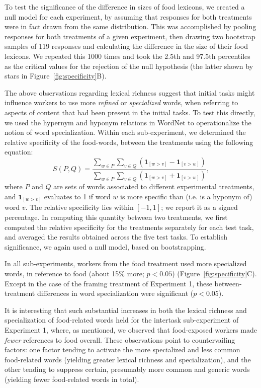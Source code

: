 \documentclass{sigchi}
\begin{document}
To test the significance of the difference in sizes of food
lexicons,
we created a null model for each experiment, by assuming that
responses for both treatments were in fact drawn from the same 
distribution.
This was accomplished by pooling responses for both treatments 
of a given experiment, then 
drawing two bootstrap samples of 119 responses and calculating
the difference in the size of their food lexicons.  
We repeated this 1000 times and took the 2.5th and 97.5th percentiles 
as the critical values for the rejection of the null hypothesis 
(the latter shown by stars in Figure~\ref{fig:specificity}B).

The above observations regarding lexical richness suggest that initial 
tasks might influence workers to use more \textit{refined} or 
\textit{specialized} words, when referring to aspects 
of content that had been present in the initial tasks.  
To test this directly, we used the hypernym and hyponym relations in 
WordNet to operationalize the notion of word specialization.  
Within each sub-experiment, we determined the relative specificity
of the food-words, between the treatments using the following equation:
\begin{equation}
	S(P,Q) = \frac{
		\sum_{w\in P}\sum_{v\in Q} \left(
			\mathbf{1}_{[w>v]} - \mathbf{1}_{[v>w]} \right)
	}{
		\sum_{w\in P}\sum_{v\in Q} \left(
			\mathbf{1}_{[w>v]} + \mathbf{1}_{[v>w]} \right)
	},
\end{equation}
where $P$ and $Q$ are sets of words associated to different experimental 
treatments, and $\mathbf{1}_{[w>v]}$ evaluates
to 1 if word $w$ is more specific than (i.e. is a hyponym of) word $v$.
The relative specificity lies within $[-1,1]$; 
we report it as a signed percentage.
In computing this quantity between two treatments, we first computed the 
relative specificity for the treatments separately for each test task, and 
averaged the results obtained across the five test tasks.  To establish
significance, we again used a null model, based on bootstrapping.

In all sub-experiments,
workers from the food treatment used more specialized words, 
in reference to food 
(about 15\% more; $p < 0.05$) (Figure~\ref{fig:specificity}C).
Except in the case of the framing treatment of Experiment 1, these 
between-treatment differences in word specialization were significant 
($p<0.05$).

It is interesting that such substantial increases in both the lexical 
richness and specialization of food-related words 
held for the intertask sub-experiment of Experiment 1, where, as mentioned,
we observed 
that food-exposed workers made \textit{fewer} references to food overall. 
These observations point 
to countervailing factors: one factor tending to activate the more 
specialized and less common food-related words 
(yielding greater lexical richness and specialization), and the other tending 
to suppress certain, presumably more common and generic words 
(yielding fewer food-related words in total).
\end{document}
